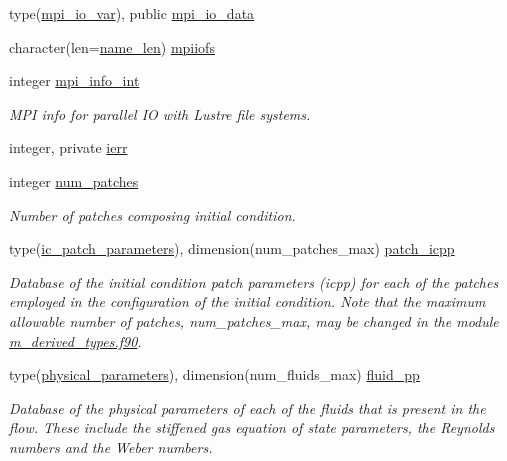 \begin{DoxyCompactItemize}
type(\hyperlink{structm__derived__types_1_1mpi__io__var}{mpi\+\_\+io\+\_\+var}), public \hyperlink{namespacem__global__parameters_ad80f68aac31aa898ab2d7729f60e375f}{mpi\+\_\+io\+\_\+data}
\item 
character(len=\hyperlink{namespacem__global__parameters_ac8252b115e717c6f1c8595be6f897df7}{name\+\_\+len}) \hyperlink{namespacem__global__parameters_ad4713c1e89eaa8fac3bb2181ba87b192}{mpiiofs}
\item 
integer \hyperlink{namespacem__global__parameters_a2663d07998d11d25e223cd7ad0bbd748}{mpi\+\_\+info\+\_\+int}
\begin{DoxyCompactList}\small\item\em M\+PI info for parallel IO with Lustre file systems. \end{DoxyCompactList}\item 
integer, private \hyperlink{namespacem__global__parameters_a46461347b5094736adfa94ef005b49a6}{ierr}
\item 
integer \hyperlink{namespacem__global__parameters_a5e346daa48cf24534ceca2f656a57255}{num\+\_\+patches}
\begin{DoxyCompactList}\small\item\em Number of patches composing initial condition. \end{DoxyCompactList}\item 
type(\hyperlink{structm__derived__types_1_1ic__patch__parameters}{ic\+\_\+patch\+\_\+parameters}), dimension(num\+\_\+patches\+\_\+max) \hyperlink{namespacem__global__parameters_ab5fc97fce88eefa124865cab08aa2250}{patch\+\_\+icpp}
\begin{DoxyCompactList}\small\item\em Database of the initial condition patch parameters (icpp) for each of the patches employed in the configuration of the initial condition. Note that the maximum allowable number of patches, num\+\_\+patches\+\_\+max, may be changed in the module \hyperlink{m__derived__types_8f90}{m\+\_\+derived\+\_\+types.\+f90}. \end{DoxyCompactList}\item 
type(\hyperlink{structm__derived__types_1_1physical__parameters}{physical\+\_\+parameters}), dimension(num\+\_\+fluids\+\_\+max) \hyperlink{namespacem__global__parameters_a7297abec8863ecabf95e24ebdae46a17}{fluid\+\_\+pp}
\begin{DoxyCompactList}\small\item\em Database of the physical parameters of each of the fluids that is present in the flow. These include the stiffened gas equation of state parameters, the Reynolds numbers and the Weber numbers. \end{DoxyCompactList}\item 

\end{DoxyCompactItemize}
